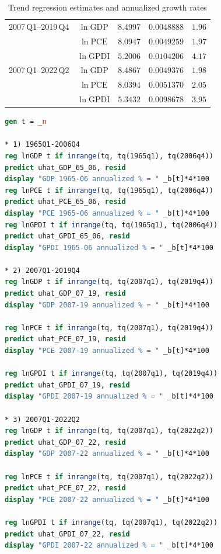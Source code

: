 \documentclass[a4paper,12pt]{article} %
\theoremstyle{nonitalic}
\newenvironment{solution}[1]
  {\renewcommand\theinnercustomsol{#1}%
   \innercustomsol}
  {\endinnercustomsol}
\newcounter{solutionctr}[section]
\renewcommand{\thesolutionctr}{(\alph{solutionctr})}
\newenvironment{autosolution}
  {\refstepcounter{solutionctr}%
   \begin{solution}{\thesolutionctr}}
  {\end{solution}}
\begin{document}
\begin{autosolution}
\begin{table}[h!]
\begin{tabular}{lcccc}
        2007\,Q1--2019\,Q4 & $\ln\mathrm{GDP}$  & $8.4997$  & $0.0048888$ & $1.96$ \\
                        & $\ln\mathrm{PCE}$  & $8.0947$  & $0.0049259$ & $1.97$ \\
                        & $\ln\mathrm{GPDI}$ & $5.2006$  & $0.0104206$ & $4.17$ \\[6pt]
        2007\,Q1--2022\,Q2 & $\ln\mathrm{GDP}$  & $8.4867$  & $0.0049376$ & $1.98$ \\
                        & $\ln\mathrm{PCE}$  & $8.0394$  & $0.0051370$ & $2.05$ \\
                        & $\ln\mathrm{GPDI}$ & $5.3432$  & $0.0098678$ & $3.95$ \\
        \bottomrule
        \end{tabular}
        \caption{Trend regression estimates and annualized growth rates}
    \end{table}
    \begin{lstlisting}[language=Stata]
gen t = _n

* 1) 1965Q1-2006Q4
reg lnGDP t if inrange(tq, tq(1965q1), tq(2006q4))
predict uhat_GDP_65_06, resid
display "GDP 1965-06 annualized % = " _b[t]*4*100
reg lnPCE t if inrange(tq, tq(1965q1), tq(2006q4))
predict uhat_PCE_65_06, resid
display "PCE 1965-06 annualized % = " _b[t]*4*100
reg lnGPDI t if inrange(tq, tq(1965q1), tq(2006q4))
predict uhat_GPDI_65_06, resid
display "GPDI 1965-06 annualized % = " _b[t]*4*100

* 2) 2007Q1-2019Q4
reg lnGDP t if inrange(tq, tq(2007q1), tq(2019q4))
predict uhat_GDP_07_19, resid
display "GDP 2007-19 annualized % = " _b[t]*4*100

reg lnPCE t if inrange(tq, tq(2007q1), tq(2019q4))
predict uhat_PCE_07_19, resid
display "PCE 2007-19 annualized % = " _b[t]*4*100

reg lnGPDI t if inrange(tq, tq(2007q1), tq(2019q4))
predict uhat_GPDI_07_19, resid
display "GPDI 2007-19 annualized % = " _b[t]*4*100

* 3) 2007Q1-2022Q2
reg lnGDP t if inrange(tq, tq(2007q1), tq(2022q2))
predict uhat_GDP_07_22, resid
display "GDP 2007-22 annualized % = " _b[t]*4*100

reg lnPCE t if inrange(tq, tq(2007q1), tq(2022q2))
predict uhat_PCE_07_22, resid
display "PCE 2007-22 annualized % = " _b[t]*4*100

reg lnGPDI t if inrange(tq, tq(2007q1), tq(2022q2))
predict uhat_GPDI_07_22, resid
display "GPDI 2007-22 annualized % = " _b[t]*4*100
    \end{lstlisting}

\end{autosolution}
\end{document}
